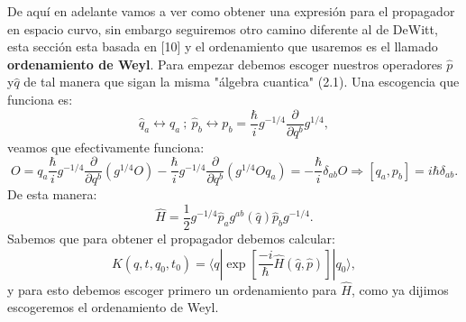 De aquí en adelante vamos a ver como obtener una expresión para el propagador en espacio curvo, sin embargo seguiremos otro camino diferente al de DeWitt, esta sección esta basada en [10] y el ordenamiento que usaremos es el llamado \textbf{ordenamiento de Weyl}. Para empezar debemos escoger nuestros operadores $\hat{p}$ y$\hat{q}$ de tal manera que sigan la misma "álgebra cuantica" (2.1). Una escogencia que funciona es:
\begin{equation}
\hat{q}_{a}\leftrightarrow q_{a}\ ;\ \hat{p}_{b}\leftrightarrow p_{b}=\frac{\hbar}{i}g^{-1/4}\frac{\partial}{\partial q^{b}}g^{1/4},
\end{equation}
veamos que efectivamente funciona:
\begin{equation}
[q_{a},p_{b}]O=q_{a}\frac{\hbar}{i}g^{-1/4}\frac{\partial}{\partial q^{b}}(g^{1/4}O)-\frac{\hbar}{i}g^{-1/4}\frac{\partial}{\partial q^{b}}(g^{1/4}Oq_{a})=-\frac{\hbar}{i}\delta_{ab}O\Rightarrow[q_{a},p_{b}]=i\hbar\delta_{ab}.
\end{equation}
De esta manera:
\begin{equation}
\hat{H}=\frac{1}{2}g^{-1/4}\hat{p}_{a}g^{ab}(\hat{q})\hat{p}_{b}g^{-1/4}.
\end{equation}
Sabemos que para obtener el propagador debemos calcular:
\begin{equation}
K(q,t,q_{0},t_{0})=\langle q|\exp\left[\frac{-i}{\hbar}\hat{H}(\hat{q},\hat{p})\right]|q_{0}\rangle,
\end{equation}
y para esto debemos escoger primero un ordenamiento para $\hat{H}$, como ya dijimos escogeremos el ordenamiento de Weyl.

